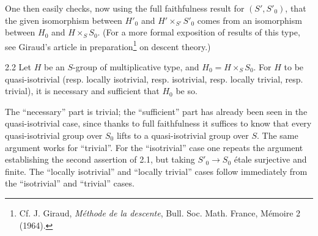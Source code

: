 One then easily checks, now using the full faithfulness result for $(S',S'_0)$, that the given isomorphism between $H'_0$ and $H'\times_{S'}S'_0$ comes from an isomorphism between $H_0$ and $H\times_S S_0$. (For a more formal exposition of results of this type, see Giraud's article in preparation\footnote{Cf. J. Giraud, \emph{Méthode de la descente}, Bull. Soc. Math. France, Mémoire 2 (1964).} on descent theory.)
\begin{corollary}{2.2}\label{X.2.2}
Let $H$ be an $S$-group of multiplicative type, and $H_0=H\times_S S_0$. For $H$ to be quasi-isotrivial (resp. locally isotrivial, resp. isotrivial, resp. locally trivial, resp. trivial), it is necessary and sufficient that $H_0$ be so.
\end{corollary}
The ``necessary'' part is trivial; the ``sufficient'' part has already been seen in the quasi-isotrivial case, since thanks to full faithfulness it suffices to know that every quasi-isotrivial group over $S_0$ lifts to a quasi-isotrivial group over $S$. The same argument works for ``trivial''. For the ``isotrivial'' case one repeats the argument establishing the second assertion of 2.1, but taking $S'_0\to S_0$ étale surjective and finite. The ``locally isotrivial'' and ``locally trivial'' cases follow immediately from the ``isotrivial'' and ``trivial'' cases.

